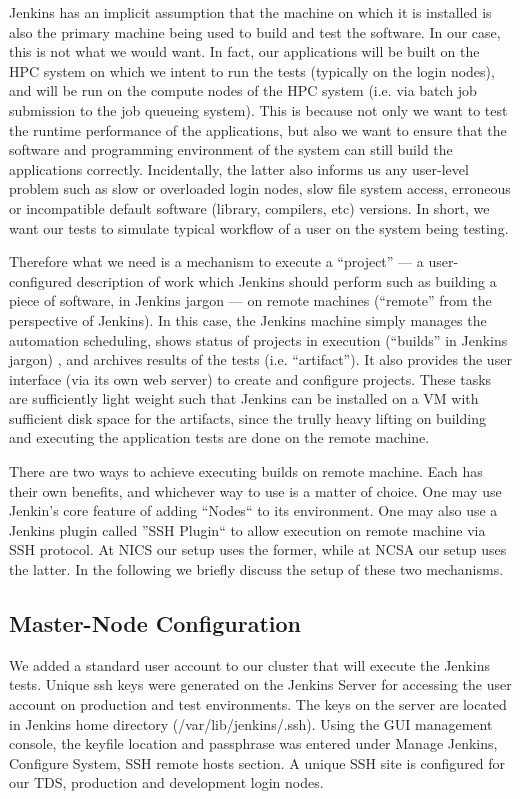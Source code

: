 \documentclass[10pt, conference, compsocconf]{IEEEtran}
\begin{document}
Jenkins has an implicit assumption that the machine on which it is installed is also the primary machine being used to build and test the software. In our case, this is not what we would want. In fact, our applications will be built on the HPC system on which we intent to run the tests (typically on the login nodes), and will be run on the compute nodes of the HPC system (i.e. via batch job submission to the job queueing system). This is because not only we want to test the runtime performance of the applications, but also we want to ensure that the software and programming environment of the system can still build the applications correctly. Incidentally, the latter also informs us any user-level problem such as slow or overloaded login nodes, slow file system access, erroneous or incompatible default software (library, compilers, etc) versions. In short, we want our tests to simulate typical workflow of a user on the system being testing.

Therefore what we need is a mechanism to execute a ``project'' --- a user-configured description of work which Jenkins should perform such as building a piece of software, in Jenkins jargon --- on remote machines (``remote'' from the perspective of Jenkins). In this case, the Jenkins machine simply manages the automation scheduling, shows status of projects in execution (``builds'' in Jenkins jargon) , and archives results of the tests (i.e. ``artifact''). It also provides the user interface (via its own web server) to create and configure projects. These tasks are sufficiently light weight such that Jenkins can be installed on a VM with sufficient disk space for the artifacts, since the trully heavy lifting on building and executing the application tests are done on the remote machine.

There are two ways to achieve executing builds on remote machine. Each has their own benefits, and whichever way to use is a matter of choice. One may use Jenkin's core feature of adding ``Nodes`` to its environment. One may also use a Jenkins plugin called ''SSH Plugin`` to allow execution on remote machine via SSH protocol. At NICS our setup uses the former, while at NCSA our setup uses the latter. In the following we briefly discuss the setup of these two mechanisms.





\subsection{Master-Node Configuration}
We added a standard user account to our cluster that will execute the Jenkins tests. Unique ssh keys were generated on the Jenkins Server for accessing the user account on production and test environments.  The keys on the server are located in Jenkins home directory (/var/lib/jenkins/.ssh). Using the GUI management console, the keyfile location and passphrase was entered under Manage Jenkins, Configure System, SSH remote hosts section. A unique SSH site is configured for our TDS, production and development login nodes.   
\end{document}
